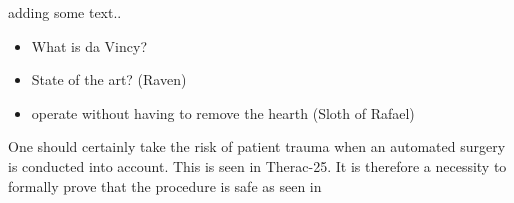 adding some text..
\begin{itemize}
\item What is da Vincy?
\item State of the art? (Raven)
\item operate without having to remove the hearth (Sloth of Rafael)
\end{itemize}
One should certainly take the risk of patient trauma when an automated surgery is conducted into account. This is seen in Therac-25. It is therefore a necessity to formally prove that the procedure is safe as seen in \citep{bib:safety}